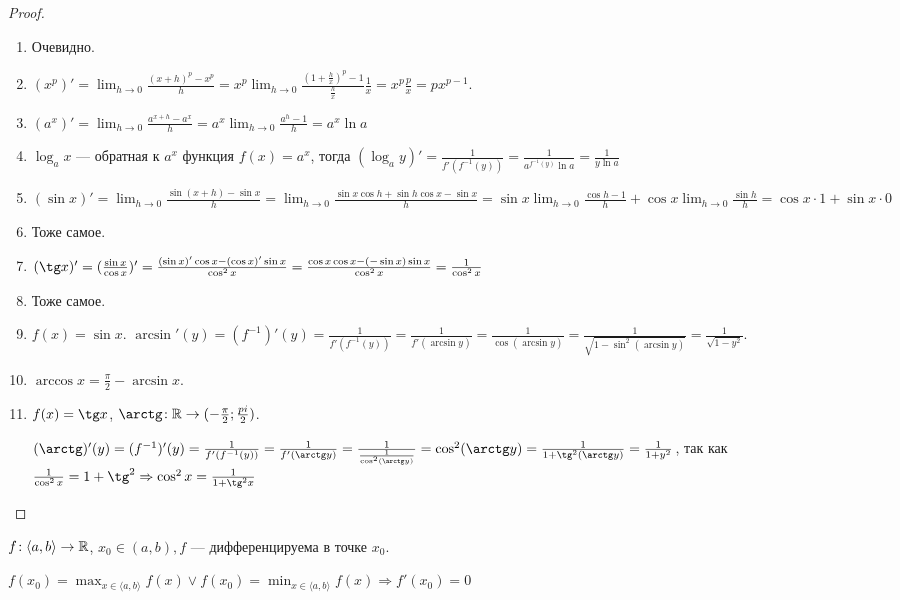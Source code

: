 \begin{proof}
    \begin{enumerate}
        \item Очевидно.
        \item $(x^p)' = \lim_{h \to 0} \frac{(x + h)^p - x^p}{h} = x^p \lim_{h \to 0} \frac{(1 + \frac{h}{x})^p - 1}{\frac{h}{x}} \frac{1}{x} = x^p \frac{p}{x} = px^{p - 1}$.
        \item $(a^x)' = \lim_{h \to 0} \frac{a^{x+h} - a^x}{h} = a^x \lim_{h \to 0} \frac{a^h - 1}{h} = a^x \ln a$
        \item $\log_a x$ --- обратная к  $a^x$ функция  $f(x) = a^x$, тогда  $(\log_a y)' = \frac{1}{f'(f^{-1}(y))} = \frac{1}{a^{f^{-1}(y)} \ln a} = \frac{1}{y \ln a}$
	\item $(\sin x)' = \lim_{h \to 0} \frac{\sin(x+h) - \sin x}{h} = \lim_{h \to 0} \frac{\sin x \cos h + \sin h \cos x - \sin x}{h} = \sin x \lim_{h\to 0}\frac{\cos h - 1}h + \cos x \lim_{h \to 0} \frac{\sin h}{h} = \cos x \cdot 1 + \sin x \cdot 0$ 
        \item Тоже самое.
        \item $(\tg x)' = (\frac{\sin x}{\cos x})' = \frac{(\sin x)' \cos x - (\cos x)' \sin x}{\cos^2 x} = \frac{\cos x \cos x - (-\sin x) \sin x}{\cos ^2 x} = \frac{1}{\cos^2 x}$
        \item Тоже самое.
        \item $f(x) = \sin x$.  $\arcsin' (y) = (f^{-1})'(y) = \frac{1}{f'(f^{-1}(y))} = \frac{1}{f'(\arcsin y)} = \frac{1}{\cos(\arcsin y)} = \frac{1}{\sqrt{1 - \sin^2(\arcsin y)}} = \frac{1}{\sqrt{1 - y^2}}$.
        \item $\arccos x = \frac{\pi}{2} - \arcsin x$.
        \item $f(x) = \tg x$,  $\arctg\!: \R \to (-\frac{\pi}{2}; \frac{pi}{2})$.

            $(\arctg)'(y) = (f^{-1})'(y) = \frac{1}{f'(f^{-1}(y))} = \frac{1}{f'(\arctg y)} = \frac{1}{\frac{1}{\cos^2(\arctg y)}} = \cos^2(\arctg y) = \frac{1}{1+\tg^2(\arctg y)} = \frac{1}{1+y^2}$, так как  $\frac{1}{\cos^2 x} = 1 + \tg^2 \Rightarrow \cos^2 x = \frac{1}{1 + \tg^2 x}$
    \end{enumerate}
\end{proof}
\begin{theorem}
    $f\!: \langle a, b \rangle \to \mathbb{R}$,  $x_0 \in (a, b), f$ --- дифференцируема в  точке $x_0$.

    $f(x_0) = \max_{x \in \langle a, b \rangle}f(x) \lor f(x_0) = \min_{x \in \langle a, b \rangle}f(x) \Rightarrow f'(x_0) = 0$
\end{theorem}
